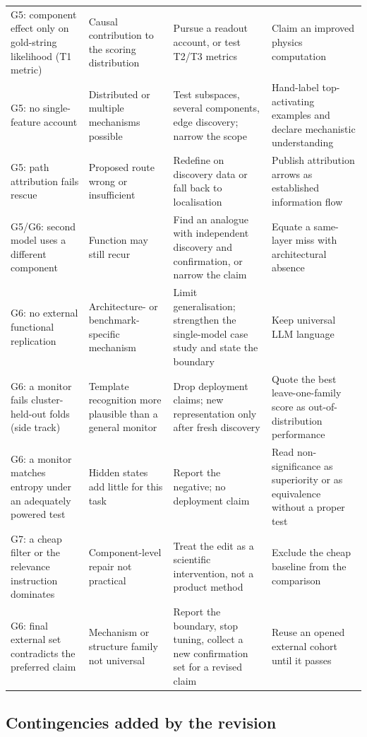 \documentclass[10pt,a4paper]{article}
\begin{document}
{\begin{longtable}{@{}P{3.3cm}P{3.5cm}P{4.2cm}P{4.0cm}@{}}
G5: component effect only on gold-string likelihood (T1 metric) & Causal contribution to the scoring
distribution & Pursue a readout account, or test T2/T3 metrics & Claim an improved physics computation \\
G5: no single-feature account & Distributed or multiple mechanisms possible & Test subspaces, several components,
edge discovery; narrow the scope & Hand-label top-activating examples and declare mechanistic understanding \\
G5: path attribution fails rescue & Proposed route wrong or insufficient & Redefine on discovery data or fall
back to localisation & Publish attribution arrows as established information flow \\
G5/G6: second model uses a different component & Function may still recur & Find an analogue with independent
discovery and confirmation, or narrow the claim & Equate a same-layer miss with architectural absence \\
G6: no external functional replication & Architecture- or benchmark-specific mechanism & Limit generalisation;
strengthen the single-model case study and state the boundary & Keep universal LLM language \\
G6: a monitor fails cluster-held-out folds (side track) & Template recognition more plausible than a general
monitor & Drop deployment claims; new representation only after fresh discovery & Quote the best leave-one-family
score as out-of-distribution performance \\
G6: a monitor matches entropy under an adequately powered test & Hidden states add little for this task &
Report the negative; no deployment claim & Read non-significance as superiority or as equivalence without a
proper test \\
G7: a cheap filter or the relevance instruction dominates & Component-level repair not practical & Treat the
edit as a scientific intervention, not a product method & Exclude the cheap baseline from the comparison \\
G6: final external set contradicts the preferred claim & Mechanism or structure family not universal & Report
the boundary, stop tuning, collect a new confirmation set for a revised claim & Reuse an opened external cohort
until it passes \\
\end{longtable}
}

\subsection{Contingencies added by the revision}
\label{sec:conditional-new}
\end{document}
